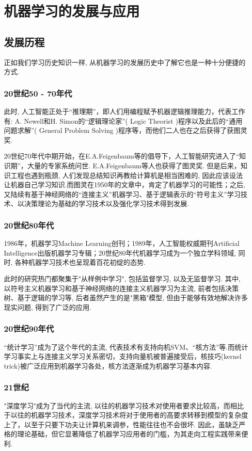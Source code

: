 \documentclass[lang=cn,11pt,a4paper]{elegantpaper}
\begin{document}
\section{机器学习的发展与应用}
\subsection{发展历程}
\par 正如我们学习历史知识一样, 从机器学习的发展历史中了解它也是一种十分便捷的方式. 
\subsubsection*{20世纪50 - 70年代}
\par 此时, 人工智能正处于“推理期”，即人们用编程赋予机器逻辑推理能力，代表工作有: A. Newell和H. Simon的“逻辑理论家”( Logic Theorist )程序以及此后的“通用问题求解”( General Problem Solving )程序等，而他们二人也在之后获得了获图灵奖. 
\par 20世纪70年代中期开始，在E.A.Feigenbaum等的倡导下，人工智能研究进入了“知识期”，大量的专家系统问世. E.A.Feigenbaum等人也获得了图灵奖. 但是后来，知识工程也遇到瓶颈, 人们发现总结知识再教给计算机是相当困难的, 因此应该设法让机器自己学习知识.而图灵在1950年的文章中，肯定了机器学习的可能性；之后, 又陆续有基于神经网络的“连接主义”机器学习、基于逻辑表示的“符号主义”学习技术、以决策理论为基础的学习技术以及强化学习技术得到发展.
\subsubsection*{20世纪80年代}
\par 1986年，机器学习Machine Learning创刊；1989年，人工智能权威期刊Artificial Intelligence出版机器学习专辑；20世纪80年代机器学习成为一个独立学科领域, 同时, 各种机器学习技术也呈现着百花初绽的态势.
\par 此时的研究热门都聚集于"从样例中学习", 包括监督学习, 以及无监督学习. 其中, 以符号主义机器学习和基于神经网络的连接主义机器学习为主流, 前者包括决策树、基于逻辑的学习等, 后者虽然产生的是"黑箱"模型, 但由于能够有效地解决许多现实问题, 得到了广泛的应用.
\subsubsection*{20世纪90年代}
“统计学习”成为了这个年代的主流, 代表技术有支持向机SVM、“核方法”等.而统计学习事实上与连接主义学习关系密切，支持向量机被普遍接受后，核技巧(kernel trick)被广泛应用到机器学习各处，核方法逐渐成为机器学习基本内容.
\subsubsection*{21世纪}
"深度学习"成为了当代的主流, 以往的机器学习技术对使用者要求比较高，而相比于以往的机器学习技术，深度学习技术将对于使用者的高要求转移到模型的复杂度上了，以至于只要下功夫让计算机来调参，性能往往也不会很坏. 因此，虽缺乏严格的理论基础，但它显著降低了机器学习应用者的门槛，为其走向工程实践带来便利.
\end{document}
